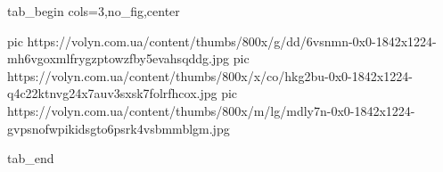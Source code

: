  
 
 
 
 


\ifcmt
  tab_begin cols=3,no_fig,center

     pic https://volyn.com.ua/content/thumbs/800x/g/dd/6vsnmn-0x0-1842x1224-mh6vgoxmlfrygzptowzfby5evahsqddg.jpg
		 pic https://volyn.com.ua/content/thumbs/800x/x/co/hkg2bu-0x0-1842x1224-q4c22ktnvg24x7auv3sxsk7folrfhcox.jpg
		 pic https://volyn.com.ua/content/thumbs/800x/m/lg/mdly7n-0x0-1842x1224-gvpsnofwpikidsgto6psrk4vsbmmblgm.jpg

  tab_end
\fi

